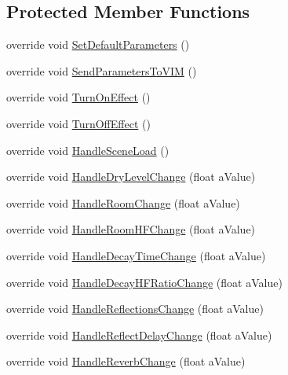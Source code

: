\subsection*{Protected Member Functions}
\begin{DoxyCompactItemize}
\item 
override void \hyperlink{class_a_t_i___reverb_filter_handler_a69a75dcda06ae1597030e0ceaf84e1ae}{Set\+Default\+Parameters} ()
\item 
override void \hyperlink{class_a_t_i___reverb_filter_handler_aacb469dc3038fca616d638f6a5a04a30}{Send\+Parameters\+To\+V\+IM} ()
\item 
override void \hyperlink{class_a_t_i___reverb_filter_handler_aa25fcaa9c07d614b869334e1db14f7d6}{Turn\+On\+Effect} ()
\item 
override void \hyperlink{class_a_t_i___reverb_filter_handler_a87b5c207c0ec0422ce8bea66a38334e2}{Turn\+Off\+Effect} ()
\item 
override void \hyperlink{class_a_t_i___reverb_filter_handler_a084dca3566139f350b0372d3ee85af84}{Handle\+Scene\+Load} ()
\item 
override void \hyperlink{class_a_t_i___reverb_filter_handler_a0af6a4381b725183fdb7cc8589a9f71f}{Handle\+Dry\+Level\+Change} (float a\+Value)
\item 
override void \hyperlink{class_a_t_i___reverb_filter_handler_a2100456086ad1adf704bf88d71dbe490}{Handle\+Room\+Change} (float a\+Value)
\item 
override void \hyperlink{class_a_t_i___reverb_filter_handler_a587ab9596231ed2ff9e3628bbc59d510}{Handle\+Room\+H\+F\+Change} (float a\+Value)
\item 
override void \hyperlink{class_a_t_i___reverb_filter_handler_a30a45fb9d8bbd7e10054eaa4595666b3}{Handle\+Decay\+Time\+Change} (float a\+Value)
\item 
override void \hyperlink{class_a_t_i___reverb_filter_handler_a68dab792c963c33be3618c9595a6a734}{Handle\+Decay\+H\+F\+Ratio\+Change} (float a\+Value)
\item 
override void \hyperlink{class_a_t_i___reverb_filter_handler_a8db38f7eafd2b1ed0a5f8d488244d83a}{Handle\+Reflections\+Change} (float a\+Value)
\item 
override void \hyperlink{class_a_t_i___reverb_filter_handler_a83de9c38851424d66456dfe98163dfde}{Handle\+Reflect\+Delay\+Change} (float a\+Value)
\item 
override void \hyperlink{class_a_t_i___reverb_filter_handler_ae228f1d67c8efd950a3b2c594d5dd9f8}{Handle\+Reverb\+Change} (float a\+Value)

\end{DoxyCompactItemize}
